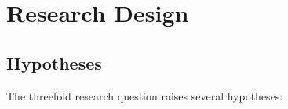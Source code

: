 



\section{Research Design}

\subsection{Hypotheses}
The threefold research question raises several hypotheses:


